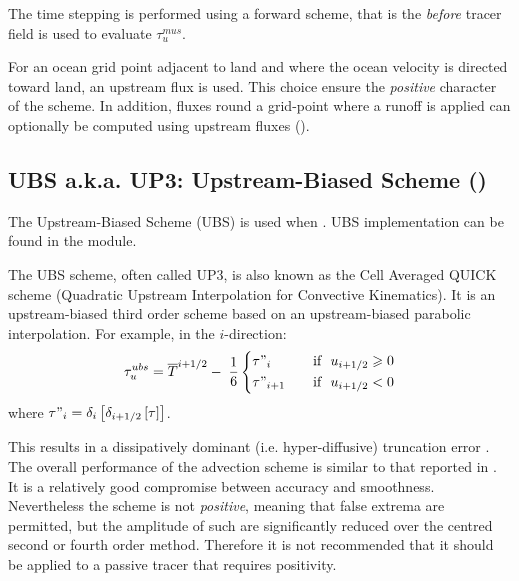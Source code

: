 \documentclass[../tex_main/NEMO_manual]{subfiles}
\begin{document}
The time stepping is performed using a forward scheme,
that is the \textit{before} tracer field is used to evaluate $\tau_u^{mus}$.

For an ocean grid point adjacent to land and where the ocean velocity is directed toward land,
an upstream flux is used.
This choice ensure the \textit{positive} character of the scheme.
In addition, fluxes round a grid-point where a runoff is applied can optionally be computed using upstream fluxes
().

\subsection{UBS a.k.a. UP3: Upstream-Biased Scheme (\protect{})}
\label{subsec:TRA_adv_ubs}

The Upstream-Biased Scheme (UBS) is used when .
UBS implementation can be found in the  module.

The UBS scheme, often called UP3, is also known as the Cell Averaged QUICK scheme
(Quadratic Upstream Interpolation for Convective Kinematics).
It is an upstream-biased third order scheme based on an upstream-biased parabolic interpolation.
For example, in the $i$-direction:
\begin{equation} \label{eq:tra_adv_ubs}
   \tau_u^{ubs} =\overline T ^{i+1/2}-\;\frac{1}{6} \left\{      
   \begin{aligned}
         &\tau"_i        	& \quad \text{if }\ u_{i+1/2} \geqslant 0      \\
         &\tau"_{i+1}	& \quad \text{if }\ u_{i+1/2}       <       0
   \end{aligned}    \right.
\end{equation}
where $\tau "_i =\delta_i \left[ {\delta_{i+1/2} \left[ \tau \right]} \right]$.

This results in a dissipatively dominant (i.e. hyper-diffusive) truncation error
\citep{Shchepetkin_McWilliams_OM05}.
The overall performance of the advection scheme is similar to that reported in \cite{Farrow1995}.
It is a relatively good compromise between accuracy and smoothness.
Nevertheless the scheme is not \emph{positive}, meaning that false extrema are permitted,
but the amplitude of such are significantly reduced over the centred second or fourth order method.
Therefore it is not recommended that it should be applied to a passive tracer that requires positivity.
\end{document}
